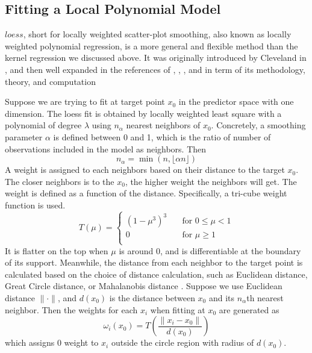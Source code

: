 \subsection{Fitting a Local Polynomial Model}
\label{sec:loess}

$loess$, short for locally weighted scatter-plot smoothing, also known as locally
weighted polynomial regression, is a more general and flexible
method than the kernel regression we discussed above. It was originally introduced 
by Cleveland in \cite{Cleveland:1979}, and then well expanded in the references 
of \cite{cleveland1988locally}, \cite{cleveland1991computational}, 
\cite{cleveland1988regression}, and \cite{cleveland1996smoothing} in term of its
methodology, theory, and computation

Suppose we are trying to fit at target point $x_0$ in the predictor space with
one dimension. The loess fit is obtained by locally weighted least square with a
polynomial of degree $\lambda$ using $n_{\alpha}$ nearest neighbors of $x_0$. 
Concretely, a smoothing parameter $\alpha$ is defined between 0 and 1, which is
the ratio of number of observations included in the model as neighbors. Then 
\begin{equation} 
n_{\alpha} = \min(n, \lfloor \alpha n \rfloor)
\end{equation}
A weight is assigned to each neighbors based on their distance to the target $x_0$.
The closer neighbors is to the $x_0$, the higher weight the neighbors will get. The
weight is defined as a function of the distance. Specifically, a tri-cube weight 
function is used.
\begin{equation} 
T(\mu) =
  \begin{cases}
    (1 - \mu^3)^3       & \quad \text{for } 0 \le \mu < 1\\
    0  & \quad \text{for } \mu \ge 1\\
  \end{cases}
\end{equation}
It is flatter on the top when $\mu$ is around 0, and is differentiable at the 
boundary of its support.
Meanwhile, the distance from each neighbor to the target point is calculated 
based on the choice of distance calculation, such as Euclidean distance, Great 
Circle distance, or Mahalanobis distance \cite{mahalanobis1936}. 
Suppose we use Euclidean distance $\|\cdot\|$, and $d(x_0)$ is the distance 
between $x_0$ and its $n_{\alpha}$th nearest neighbor.
Then the weights for each $x_i$ when fitting at $x_0$ are generated as
\begin{equation} 
\omega_i(x_0) = T \left( \frac{\| x_i - x_0 \|}{d(x_0)} \right)
\end{equation}
which assigns 0 weight to $x_i$ outside the circle region with radius of $d(x_0)$.

